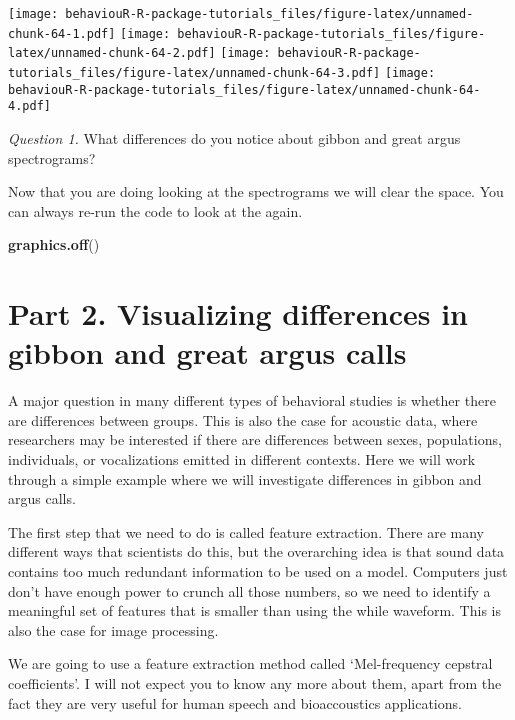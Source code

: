 \documentclass[]{book}
\newenvironment{Shaded}{\begin{snugshade}}{\end{snugshade}}
\newcommand{\KeywordTok}[1]{\textcolor[rgb]{0.13,0.29,0.53}{\textbf{#1}}}
\newcommand{\NormalTok}[1]{#1}
\begin{document}
\texttt{[image: behaviouR-R-package-tutorials\_files/figure-latex/unnamed-chunk-64-1.pdf]} \texttt{[image: behaviouR-R-package-tutorials\_files/figure-latex/unnamed-chunk-64-2.pdf]} \texttt{[image: behaviouR-R-package-tutorials\_files/figure-latex/unnamed-chunk-64-3.pdf]} \texttt{[image: behaviouR-R-package-tutorials\_files/figure-latex/unnamed-chunk-64-4.pdf]}

\emph{Question 1.} What differences do you notice about gibbon and great argus spectrograms?

Now that you are doing looking at the spectrograms we will clear the space. You can always re-run the code to look at the again.

\begin{Shaded}
\begin{Highlighting}[]
\KeywordTok{graphics.off}\NormalTok{()}
\end{Highlighting}
\end{Shaded}

\hypertarget{part-2.-visualizing-differences-in-gibbon-and-great-argus-calls}{%
\section*{Part 2. Visualizing differences in gibbon and great argus calls}\label{part-2.-visualizing-differences-in-gibbon-and-great-argus-calls}}

A major question in many different types of behavioral studies is whether there are differences between groups. This is also the case for acoustic data, where researchers may be interested if there are differences between sexes, populations, individuals, or vocalizations emitted in different contexts. Here we will work through a simple example where we will investigate differences in gibbon and argus calls.

The first step that we need to do is called feature extraction. There are many different ways that scientists do this, but the overarching idea is that sound data contains too much redundant information to be used on a model. Computers just don't have enough power to crunch all those numbers, so we need to identify a meaningful set of features that is smaller than using the while waveform. This is also the case for image processing.

We are going to use a feature extraction method called `Mel-frequency cepstral coefficients'. I will not expect you to know any more about them, apart from the fact they are very useful for human speech and bioaccoustics applications.
\end{document}
